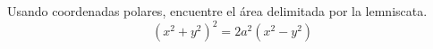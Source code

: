 Usando coordenadas polares, encuentre el área delimitada por la lemniscata.
\[
(x^2 + y^2)^2 = 2a^2(x^2 - y^2)
\]
